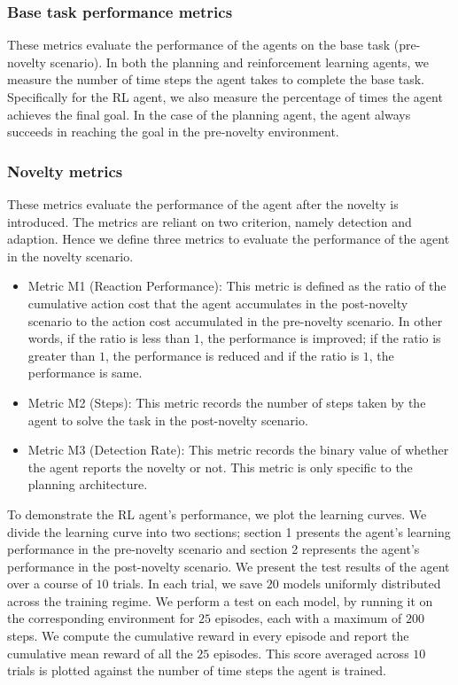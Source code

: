 \documentclass[sigconf]{aamas}
\begin{document}
\subsubsection{Base task performance metrics} 
These metrics evaluate the performance of the agents on the base task (pre-novelty scenario). In both the planning and reinforcement learning agents, we measure the number of time steps the agent takes to complete the base task. Specifically for the RL agent, we also measure the percentage of times the agent achieves the final goal. In the case of the planning agent, the agent always succeeds in reaching the goal in the pre-novelty environment.

\subsubsection{Novelty metrics} 
\label{sec:metrics}
These metrics evaluate the performance of the agent after the novelty is introduced.
The metrics are reliant on two criterion, namely detection and adaption. Hence we define three metrics to evaluate the performance of the agent in the novelty scenario.
%
\begin{itemize}
    \item Metric M1 (Reaction Performance): This metric is defined as the ratio of the cumulative action cost that the agent accumulates in the post-novelty scenario to the action cost accumulated in the pre-novelty scenario. In other words, if the ratio is less than $1$, the performance is improved; if the ratio is greater than $1$, the performance is reduced and if the ratio is $1$, the performance is same.
    \item Metric M2 (Steps): This metric records the number of steps taken by the agent to solve the task in the post-novelty scenario.
    \item Metric M3 (Detection Rate): This metric records the binary value of whether the agent reports the novelty or not. This metric is only specific to the planning architecture.
\end{itemize}
%
To demonstrate the RL agent's performance, we plot the learning curves. We divide the learning curve into two sections; section 1 presents the agent's learning performance in the pre-novelty scenario and section 2 represents the agent's performance in the post-novelty scenario. We present the test results of the agent over a course of $10$ trials. In each trial, we save $20$ models uniformly distributed across the training regime. We perform a test on each model, by running it on the corresponding environment for $25$ episodes, each with a maximum of $200$ steps. We compute the cumulative reward in every episode and report the cumulative mean reward of all the $25$ episodes. This score averaged across $10$ trials is plotted against the number of time steps the agent is trained. 
\end{document}
